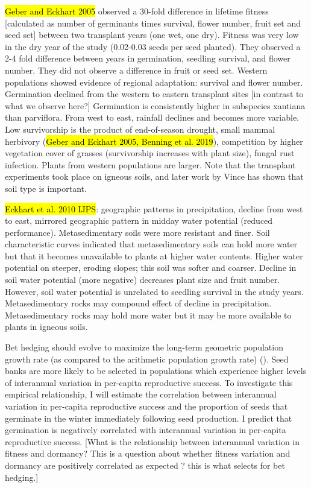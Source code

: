 \documentclass[12pt, oneside, titlepage]{article}   	%
\begin{document}
{\hl{Geber and Eckhart 2005} observed a 30-fold difference in lifetime fitness [calculated as number of germinants times survival, flower number, fruit set and seed set] between two transplant years (one wet, one dry). Fitness was very low in the dry year of the study (0.02-0.03 seeds per seed planted). They observed a 2-4 fold difference between years in germination, seedling survival, and flower number. They did not observe a difference in fruit or seed set. Western populations showed evidence of regional adaptation: survival and flower number. Germination declined from the western to eastern transplant sites [in contrast to what we observe here?] Germination is consistently higher in subspecies xantiana than parviflora. From west to east, rainfall declines and becomes more variable. Low survivorship is the product of end-of-season drought, small mammal herbivory (\hl{Geber and Eckhart 2005, Benning et al. 2019}), competition by higher vegetation cover of grasses (survivorship increases with plant size), fungal rust infection. Plants from western populations are larger. Note that the transplant experiments took place on igneous soils, and later work by Vince has shown that soil type is important. 

\hl{Eckhart et al. 2010 IJPS}: geographic patterns in precipitation, decline from west to east, mirrored geographic pattern in midday water potential (reduced performance). Metasedimentary soils were more resistant and finer. Soil characteristic curves indicated that metasedimentary soils can hold more water but that it becomes unavailable to plants at higher water contents. Higher water potential on steeper, eroding slopes; this soil was softer and coarser. Decline in soil water potential (more negative) decreases plant size and fruit number. However, soil water potential is unrelated to seedling survival in the study years. Metasedimentary rocks may compound effect of decline in precipitation. Metasedimentary rocks may hold more water but it may be more available to plants in igneous soils. 

Bet hedging should evolve to maximize the long-term geometric population growth rate (as compared to the arithmetic population growth rate) (\cite{cohen1966,cohen1968,ellner1985,ellner1985a}). Seed banks are more likely to be selected in populations which experience higher levels of interannual variation in per-capita reproductive success. To investigate this empirical relationship, I will estimate the correlation between interannual variation in per-capita reproductive success and the proportion of seeds that germinate in the winter immediately following seed production. I predict that germination is negatively correlated with interannual variation in per-capita reproductive success. [What is the relationship between interannual variation in fitness and dormancy? This is a question about whether fitness variation and dormancy are positively correlated as expected ? this is what selects for bet hedging.]

}
\end{document}
